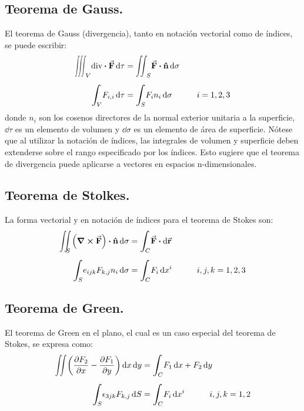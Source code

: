 \documentclass[hidelinks,12pt]{article}
\def\scaleint#1{\vcenter{\hbox{\scaleto[3ex]{\displaystyle\int}{#1}}}}
\def\scaleiint#1{\vcenter{\hbox{\scaleto[3ex]{\displaystyle\iint}{#1}}}}
\def\scaleiiint#1{\vcenter{\hbox{\scaleto[3ex]{\displaystyle\iiint}{#1}}}}
\def\bs{\mkern-12mu}
\begin{document}
\subsection{Teorema de Gauss.}

El teorema de Gauss (divergencia), tanto en notación vectorial como de índices, se puede escribir:
\begin{align}
\begin{aligned}
\scaleiiint{6ex}_{V} \text{div} \vdot \va{F} \dd{\tau} &= \scaleiint{6ex}_{S} \va{F} \vdot \vu{n} \dd{\sigma} \\[0.5em]
\scaleint{6ex}_{\bs V} F_{i, i} \dd{\tau} &= \scaleint{6ex}_{\bs S} F_{i} n_{i} \dd{\sigma} \hspace{1cm} i = 1, 2, 3
\end{aligned}
\label{eq:ecuacion_01_01_16}
\end{align}
donde $n_{i}$ son los cosenos directores de la normal exterior unitaria a la superficie, $\dd{\tau}$ es un elemento de volumen y $\dd{\sigma}$ es un elemento de área de superficie. Nótese que al utilizar la notación de índices, las integrales de volumen y superficie deben extenderse sobre el rango especificado por los índices. Esto sugiere que el teorema de divergencia puede aplicarse a vectores en espacios n-dimensionales.

\subsection{Teorema de Stolkes.}

La forma vectorial y en notación de índices para el teorema de Stokes son:
\begin{align}
\begin{aligned}
\scaleiint{6ex}_{\bs S} \left( \curl{\va{F}} \right) \vdot \vu{n} \dd{\sigma} &= \scaleint{6ex}_{\bs C} \va{F} \vdot \dd{\va{r}} \\[0.5em]
\scaleint{6ex}_{\bs S} e_{ijk} F_{k,j} n_{i} \dd{\sigma} &= \scaleint{6ex}_{\bs C} F_{i} \dd{x^{i}} \hspace{1cm} i, j, k = 1, 2, 3
\end{aligned}
\label{eq:ecuacion_01_01_17}
\end{align}

\subsection{Teorema de Green.}

El teorema de Green en el plano, el cual es un caso especial del teorema de Stokes, se expresa como:
\begin{align}
\begin{aligned}
\scaleiint{6ex} \left( \pdv{F_{2}}{x} - \pdv{F_{1}}{y} \right) \dd{x} \dd{y} &= \scaleint{6ex}_{\bs C} F_{1} \dd{x} + F_{2} \dd{y} \\[0.5em]
\scaleint{6ex}_{\bs S} \epsilon_{3jk} F_{k,j} \dd{S} &= \scaleint{6ex}_{\bs C} F_{i} \dd{x^{i}} \hspace{1cm} i, j, k = 1, 2
\end{aligned}
\label{eq:ecuacion_01_01_18}
\end{align}
\end{document}
